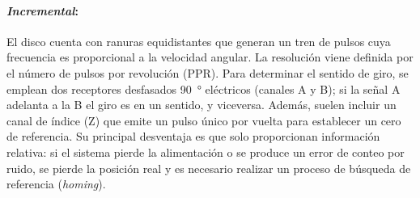 \begin{marginfigure}
  \caption[Encoders ópticos incremental y absoluto.]{%
    Comparativa de encoders ópticos. \emph{Izquierda}: el encoder \emph{incremental} genera señales en cuadratura A y B para determinar velocidad y sentido. \emph{Derecha}: el encoder \emph{absoluto} utiliza pistas concéntricas codificadas (ej. código Gray) para identificar la posición angular exacta de forma unívoca y permanente.}\label{fig:encoder}
\end{marginfigure}






    \paragraph{\emph{Incremental}:} El disco cuenta con ranuras equidistantes que generan un tren de pulsos cuya frecuencia es proporcional a la velocidad angular. La resolución viene definida por el número de pulsos por revolución (PPR). Para determinar el sentido de giro, se emplean dos receptores desfasados \qty{90}{\degree} eléctricos (canales A y B); si la señal A adelanta a la B el giro es en un sentido, y viceversa. Además, suelen incluir un canal de índice (Z) que emite un pulso único por vuelta para establecer un cero de referencia. Su principal desventaja es que solo proporcionan información relativa: si el sistema pierde la alimentación o se produce un error de conteo por ruido, se pierde la posición real y es necesario realizar un proceso de búsqueda de referencia (\textit{homing}).
